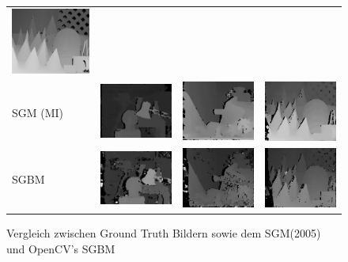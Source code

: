 \begin{figure}[h]
\begin{tabular}{m{2cm} m{3.3cm} m{3.3cm} m{3.3cm}}
	\includegraphics[width=3cm]{img/disparity_images/gt_cones.png} 
	\\
	{\scriptsize SGM (MI)} &
	\includegraphics[width=3cm]{img/disparity_images/sgm_tsukuba.png} &
	\includegraphics[width=3cm]{img/disparity_images/sgm_teddy.png} &
	\includegraphics[width=3cm]{img/disparity_images/sgm_cones.png}
	\\ 
	{\scriptsize SGBM} &
	\includegraphics[width=3cm]{img/disparity_images/sgbm_tsukuba.png} &
	\includegraphics[width=3cm]{img/disparity_images/sgbm_teddy.png} &
	\includegraphics[width=3cm]{img/disparity_images/sgbm_cones.png}
	 \\ 
	\end{tabular}
\caption{Vergleich zwischen Ground Truth Bildern sowie dem SGM(2005) und OpenCV's SGBM}
\label{fig:disparity_comparison}
\end{figure}

